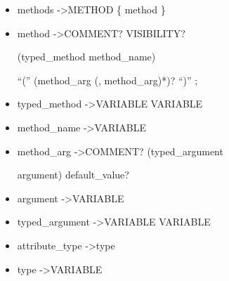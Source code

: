 \begin{itemize}
 \item methods   -\textgreater   METHOD  \{  method  \}

 \item method   -\textgreater   COMMENT?  VISIBILITY?  
 
 (typed{\_}method \textbar method{\_}name)  
 
 ``(''  (method{\_}arg  (,  method{\_}arg)*)?  ``)''  ;

 \item typed{\_}method   -\textgreater   VARIABLE  VARIABLE

 \item method{\_}name   -\textgreater   VARIABLE

 \item method{\_}arg   -\textgreater   COMMENT?  (typed{\_}argument 
 
 \textbar argument)  default{\_}value?

 \item argument   -\textgreater   VARIABLE

 \item typed{\_}argument   -\textgreater   VARIABLE  VARIABLE

 \item attribute{\_}type   -\textgreater   type

 \item type   -\textgreater   VARIABLE

 \end{itemize}